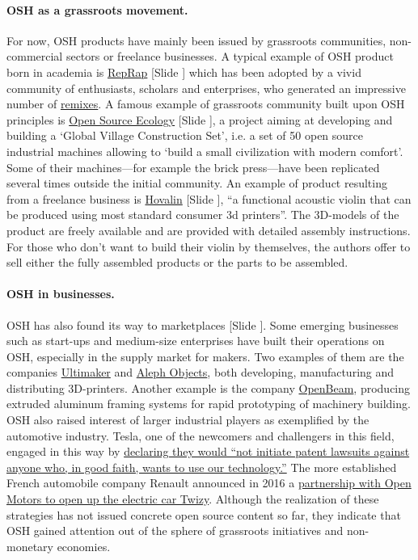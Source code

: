 \documentclass{article}
\newcounter{slide}
\begin{document}
\paragraph{OSH as a grassroots movement.} For now, OSH products have mainly been issued by grassroots communities, non-commercial sectors or freelance businesses. A typical example of OSH product born in academia is \href{https://reprap.org}{RepRap} {\color{blue}[Slide ]} which has been adopted by a vivid community of enthusiasts, scholars and enterprises, who generated an impressive number of \href{https://reprap.org/wiki/RepRap_Family_Tree}{remixes}. A famous example of grassroots community built upon OSH principles is \href{https://www.opensourceecology.org/}{Open Source Ecology} {\color{blue}[Slide ]}, a project aiming at developing and building a `Global Village Construction Set', i.e. a set of 50 open source industrial machines allowing to `build a small civilization with modern comfort'. Some of their machines---for example the brick press---have been replicated several times outside the initial community. An example of product resulting from a freelance business is \href{http://www.hovalabs.com/hova-instruments/hovalin}{Hovalin} {\color{blue}[Slide ]}, ``a functional acoustic violin that can be produced using most standard consumer 3d printers''. The 3D-models of the product are freely available and are provided with detailed assembly instructions. For those who don't want to build their violin by themselves, the authors offer to sell either the fully assembled products or the parts to be assembled.

\paragraph{OSH in businesses.} OSH has also found its way to marketplaces {\color{blue}[Slide ]}. Some emerging businesses such as start-ups and medium-size enterprises have built their operations on OSH, especially in the supply market for makers. Two examples of them are the companies \href{https://ultimaker.com/}{Ultimaker} and \href{https://www.alephobjects.com/}{Aleph Objects}, both developing, manufacturing and distributing 3D-printers. Another example is the company \href{https://ztautomations.com/openbeam/}{OpenBeam}, producing extruded aluminum framing systems for rapid prototyping of machinery building. OSH also raised interest of larger industrial players as exemplified by the automotive industry. Tesla, one of the newcomers and challengers in this field, engaged in this way by \href{https://www.tesla.com/blog/all-our-patent-are-belong-you}{declaring they would ``not initiate patent lawsuits against anyone who, in good faith, wants to use our technology.''} The more established French automobile company Renault announced in 2016 a \href{https://www.openmotors.co/renaultpomsignup/}{partnership with Open Motors to open up the electric car Twizy}. Although the realization of these strategies has not issued concrete open source content so far, they indicate that OSH gained attention out of the sphere of grassroots initiatives and non-monetary economies.
\end{document}
